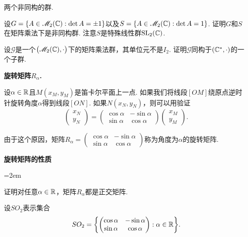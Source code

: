 \begin{problem}
  {\kaishu 两个非同构的群.}

  设$G=\{A\in\mathscr M_2(\mathbb C):\det A=\pm1\}$以及$S=\{A\in\mathscr M_2(\mathbb C):\det A=1\}$. 证明$G$和$S$在矩阵乘法下是{\kaishu 非同构群}. 注意$S$是特殊线性群$\operatorname{SL}_2(\mathbb C)$.
\end{problem}

\begin{problem}
  设$\mathscr G$是一个$\big(\mathscr M_2(\mathbb C),\cdot\big)$下的矩阵乘法群，其单位元不是$I_2$. 证明$\mathscr G$同构于$(\mathbb C^\ast,\cdot)$的一个子群.
\end{problem}

\begin{mybox}
\begin{problem}
  {\bfseries 旋转矩阵$R_\alpha$.}

  设$\alpha\in\mathbb R$且$M(x_M,y_M)$是笛卡尔平面上一点. 如果我们将线段$[OM]$绕原点逆时针旋转角度$\alpha$得到线段$[ON]$.  如果$N(x_N,y_N)$，则可以用验证
  \[
    \begin{pmatrix}
      x_N \\ y_N
    \end{pmatrix} =
    \begin{pmatrix}
      \cos\alpha & -\sin\alpha \\
      \sin\alpha & \cos \alpha
    \end{pmatrix}\begin{pmatrix}
      x_M \\ y_M
    \end{pmatrix}.
  \]

  由于这个原因，矩阵$R_\alpha=\begin{pmatrix}
    \cos\alpha & -\sin\alpha \\
    \sin\alpha & \cos\alpha
  \end{pmatrix}$称为角度为$\alpha$的{\kaishu 旋转矩阵}.

  {\bfseries 旋转矩阵的性质}
  \begin{enum}\parindent=2em
    \item 证明对任意$\alpha\in\mathbb R$，矩阵$R_\alpha$都是正交矩阵.
    \item 设$SO_2$表示集合
    \[
      SO_2 = \left\{
        \begin{pmatrix}
          \cos\alpha & -\sin\alpha \\
          \sin\alpha & \cos\alpha
        \end{pmatrix}:\alpha\in\MR
      \right\}.
    \]


\end{enum}
\end{problem}
\end{mybox}
